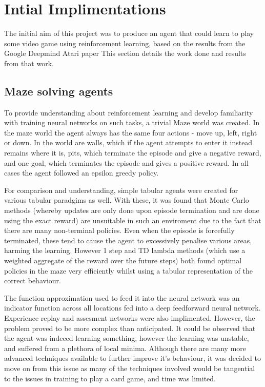 \section{Intial Implimentations}
The initial aim of this project was to produce an agent that could learn to play some video game using reinforcement learning, based on the results from the Google Deepmind Atari paper \cite{ataripaper} %
This section details the work done and results from that work.
\subsection{Maze solving agents}
To provide understanding about reinforcement learning and develop familiarity with training neural networks on such tasks, a trivial Maze world was created. In the maze world the agent always has the same four actions - move up, left, right or down. In the world are walls, which if the agent attempts to enter it instead remains where it is, pits, which terminate the episode and give a negative reward, and one goal, which terminates the episode and gives a positive reward.
In all cases the agent followed an epsilon greedy policy. %

For comparison and understanding, simple tabular agents were created for various tabular paradgims as well. With these, it was found that Monte Carlo methods (whereby updates are only done upon episode termination and are done using the exact reward) are unsuitable in such an enviroment due to the fact that there are many non-terminal policies. Even when the episode is forcefully terminated, these tend to cause the agent to excessively penalise various areas, harming the learning. However 1 step and TD lambda methods (which use a weighted aggregate of the reward over the future steps) both found optimal policies in the maze very efficiently whilst using a tabular representation of the correct behaviour.

The function approximation used to feed it into the neural network was an indicator function across all locations fed into a deep feedforward neural network. Experience replay and assesment networks were also implimented. However, the problem proved to be more complex than anticipated. It could be observed that the agent was indeeed learning something, however the learning was unstable, and suffered from a plethora of local minima. Although there are many more advanced techniques available to further improve it's behaviour, it was decided to move on from this issue as many of the techniques involved would be tangential to the issues in training to play a card game, and time was limited.